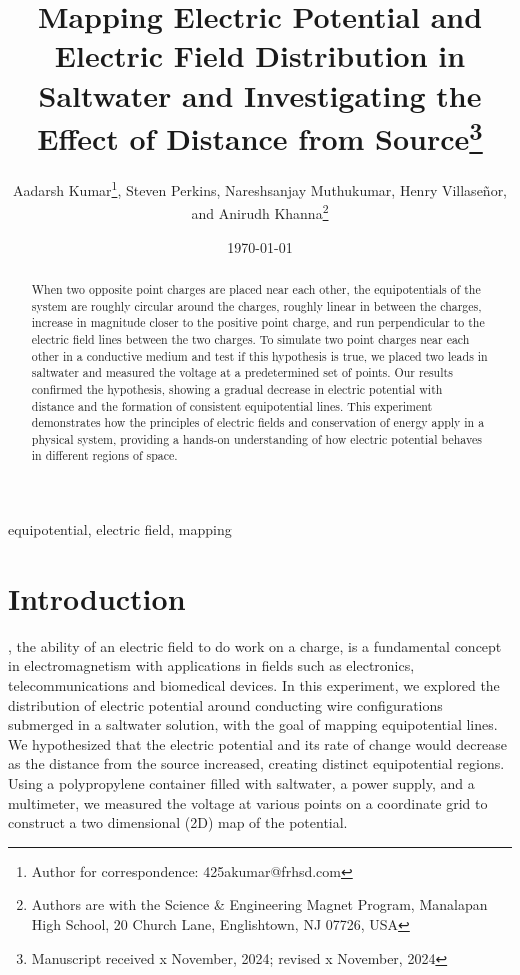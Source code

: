 ﻿\documentclass[10pt,journal,twoside]{IEEEtran}
\title{Mapping Electric Potential and Electric Field Distribution in Saltwater and Investigating the Effect of Distance from Source\thanks{Manuscript received x November, 2024; revised x November, 2024}}
\author{Aadarsh Kumar\thanks{Author for correspondence: 425akumar@frhsd.com}, Steven Perkins, Nareshsanjay Muthukumar, Henry Villase\~{n}or, and Anirudh Khanna\thanks{Authors are with the Science \& Engineering Magnet Program, Manalapan High School, 20 Church Lane, Englishtown, NJ 07726, USA}}
\date{\today}
\newcommand{\keywords}{equipotential, electric field, mapping}
\begin{document}
\maketitle

\begin{abstract}
When two opposite point charges are placed near each other, the equipotentials of the system are roughly circular around the charges, roughly linear in between the charges, increase in magnitude closer to the positive point charge, and run perpendicular to the electric field lines between the two charges. To simulate two point charges near each other in a conductive medium and test if this hypothesis is true, we placed two leads in saltwater and measured the voltage at a predetermined set of points. Our results confirmed the hypothesis, showing a gradual decrease in electric potential with distance and the formation of consistent equipotential lines. This experiment demonstrates how the principles of electric fields and conservation of energy apply in a physical system, providing a hands-on understanding of how electric potential behaves in different regions of space.
\end{abstract}

\begin{IEEEkeywords}
\keywords
\end{IEEEkeywords}

\section{Introduction}
, the ability of an electric field to do work on a charge, is a fundamental concept in electromagnetism \cite{tipler} with applications in fields such as electronics, telecommunications and biomedical devices. In this experiment, we explored the distribution of electric potential around conducting wire configurations submerged in a saltwater solution, with the goal of mapping equipotential lines. We hypothesized that the electric potential and its rate of change would decrease as the distance from the source increased, creating distinct equipotential regions. Using a polypropylene container filled with saltwater, a power supply, and a multimeter, we measured the voltage at various points on a coordinate grid to construct a two dimensional (2D) map of the potential.
 
 
 
 
 
 
\end{document}
